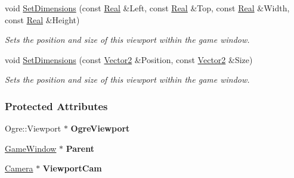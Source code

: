 \begin{DoxyCompactItemize}
void \hyperlink{classMezzanine_1_1Viewport_acd7fe51cfd7991dcb6d416cf05c6277b}{SetDimensions} (const \hyperlink{namespaceMezzanine_a726731b1a7df72bf3583e4a97282c6f6}{Real} \&Left, const \hyperlink{namespaceMezzanine_a726731b1a7df72bf3583e4a97282c6f6}{Real} \&Top, const \hyperlink{namespaceMezzanine_a726731b1a7df72bf3583e4a97282c6f6}{Real} \&Width, const \hyperlink{namespaceMezzanine_a726731b1a7df72bf3583e4a97282c6f6}{Real} \&Height)
\begin{DoxyCompactList}\small\item\em Sets the position and size of this viewport within the game window. \item\end{DoxyCompactList}\item 
void \hyperlink{classMezzanine_1_1Viewport_a3f92528a6302e5e52fb8fb2f56f14828}{SetDimensions} (const \hyperlink{classMezzanine_1_1Vector2}{Vector2} \&Position, const \hyperlink{classMezzanine_1_1Vector2}{Vector2} \&Size)
\begin{DoxyCompactList}\small\item\em Sets the position and size of this viewport within the game window. \item\end{DoxyCompactList}\end{DoxyCompactItemize}
\subsubsection*{Protected Attributes}
\begin{DoxyCompactItemize}
\item 
\hypertarget{classMezzanine_1_1Viewport_af731681b62eb9d811d15b79f0d12ba2f}{
Ogre::Viewport $\ast$ {\bfseries OgreViewport}}
\label{classMezzanine_1_1Viewport_af731681b62eb9d811d15b79f0d12ba2f}

\item 
\hypertarget{classMezzanine_1_1Viewport_a0e18699e4f7e71c971f4ddaf1eae43bd}{
\hyperlink{classMezzanine_1_1GameWindow}{GameWindow} $\ast$ {\bfseries Parent}}
\label{classMezzanine_1_1Viewport_a0e18699e4f7e71c971f4ddaf1eae43bd}

\item 
\hypertarget{classMezzanine_1_1Viewport_a56e2f807a9a086ad1c3b6b5a6b96deee}{
\hyperlink{classMezzanine_1_1Camera}{Camera} $\ast$ {\bfseries ViewportCam}}
\label{classMezzanine_1_1Viewport_a56e2f807a9a086ad1c3b6b5a6b96deee}

\end{DoxyCompactItemize}


